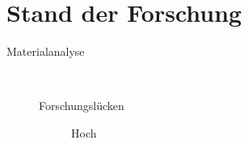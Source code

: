 \chapter{Stand der Forschung}\label{ch:stand-der-forschung}

\begin{description}
    \item[Materialanalyse]~\avoidpagebreak{}
    \begin{description}
        \item[Forschungslücken] Hoch
    \end{description}
\end{description}
